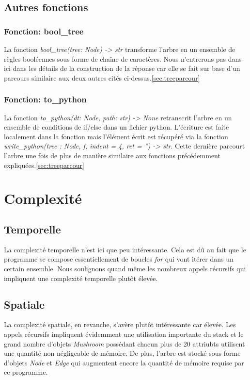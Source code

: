 \documentclass[utf8]{article}
\begin{document}
\subsection{Autres fonctions}

\subsubsection{Fonction: bool\_tree}
La fonction \emph{bool\_tree(tree: Node) -> str} transforme l'arbre en un ensemble de règles booléennes sous forme de chaîne de caractères. Nous n'entrerons pas dans ici dans les détails de la construction de la réponse car 
elle se fait sur base d'un parcours similaire aux deux autres cités ci-dessus.\ref{sec:treeparcour}

\subsubsection{Fonction: to\_python}
La fonction \emph{to\_python(dt: Node, path: str) -> None} retranscrit l'arbre en un ensemble de conditions de if/else dans un fichier python. L'écriture est faite localement dans la fonction mais l'élément écrit est récupéré via
la fonction \emph{write\_python(tree : Node, f, indent = 4, ret = '') -> str}. Cette dernière parcourt l'arbre une fois de plus de manière similaire aux fonctions précédemment expliquées.\ref{sec:treeparcour}


\section{Complexité}

\subsection{Temporelle}
La complexité temporelle n'est ici que peu intéressante. Cela est dû au fait que le programme se compose essentiellement de boucles \emph{for} qui vont itérer dans un certain ensemble. Nous soulignons quand même
les nombreux appels récursifs qui impliquent une complexité temporelle plutôt élevée.

\subsection{Spatiale}
La complexité spatiale, en revanche, s'avère plutôt intéressante car élevée. Les appels récursifs impliquent évidemment une utilisation importante du stack et le grand nombre d'objets \emph{Mushroom} possédant chacun
plus de 20 attriubts utilisent une quantité non négligeable de mémoire. De plus, l'arbre est stocké sous forme d'objets \emph{Node} et \emph{Edge} qui augmentent encore la quantité de mémoire requise par ce programme.
\end{document}
